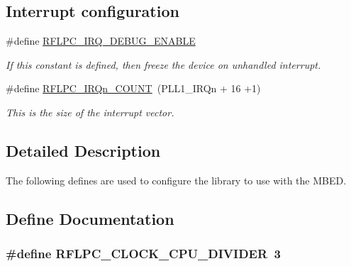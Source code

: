 \subsection*{Interrupt configuration}
\begin{DoxyCompactItemize}
\item 
\hypertarget{group__config_gaf855ea6f86cabcbdbb354c395fd08369}{\#define \hyperlink{group__config_gaf855ea6f86cabcbdbb354c395fd08369}{R\-F\-L\-P\-C\-\_\-\-I\-R\-Q\-\_\-\-D\-E\-B\-U\-G\-\_\-\-E\-N\-A\-B\-L\-E}}\label{group__config_gaf855ea6f86cabcbdbb354c395fd08369}

\begin{DoxyCompactList}\small\item\em If this constant is defined, then freeze the device on unhandled interrupt. \end{DoxyCompactList}\item 
\hypertarget{group__config_ga8ca8f165a35db7d7c870a54e57221fbf}{\#define \hyperlink{group__config_ga8ca8f165a35db7d7c870a54e57221fbf}{R\-F\-L\-P\-C\-\_\-\-I\-R\-Qn\-\_\-\-C\-O\-U\-N\-T}~(P\-L\-L1\-\_\-\-I\-R\-Qn + 16 +1)}\label{group__config_ga8ca8f165a35db7d7c870a54e57221fbf}

\begin{DoxyCompactList}\small\item\em This is the size of the interrupt vector. \end{DoxyCompactList}\end{DoxyCompactItemize}


\subsection{Detailed Description}
The following defines are used to configure the library to use with the M\-B\-E\-D. 

\subsection{Define Documentation}
\hypertarget{group__config_ga90b12dedcc59811400db87190281f77f}{
\subsubsection[{R\-F\-L\-P\-C\-\_\-\-C\-L\-O\-C\-K\-\_\-\-C\-P\-U\-\_\-\-D\-I\-V\-I\-D\-E\-R}]{\setlength{\rightskip}{0pt plus 5cm}\#define {\bf R\-F\-L\-P\-C\-\_\-\-C\-L\-O\-C\-K\-\_\-\-C\-P\-U\-\_\-\-D\-I\-V\-I\-D\-E\-R}~3}}\label{group__config_ga90b12dedcc59811400db87190281f77f}


